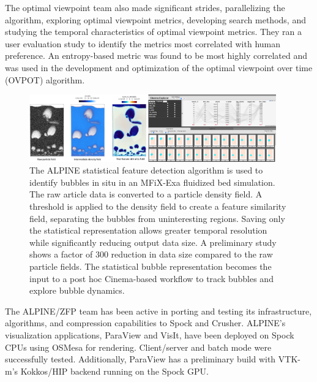 
The optimal viewpoint team also made significant strides, parallelizing the algorithm, exploring optimal viewpoint metrics, developing search methods, and studying the temporal characteristics of optimal viewpoint metrics.  They ran a user evaluation study to identify the metrics most correlated with human preference.  An entropy-based metric was found to be most highly correlated and was used in the development and optimization of the optimal viewpoint over time (OVPOT) algorithm.  

\begin{figure}[htb]
	\begin{center}
		\includegraphics[width=0.95\textwidth]{projects/2.3.4-DataViz/2.3.4.16-ALPINE-ZFP/alpine-cinema-mfixexa-workflow.png}
		\caption{The ALPINE statistical feature detection algorithm is used to identify bubbles in situ in an MFiX-Exa fluidized bed simulation.  The raw article data is converted to a particle density field.  A threshold is applied to the density field to create a feature similarity field, separating the  bubbles from uninteresting regions.  Saving only the statistical representation allows greater temporal resolution while significantly reducing output data size.  A preliminary study shows a factor of 300 reduction in data size compared to the raw particle fields. The statistical bubble representation becomes the input to a post hoc Cinema-based workflow to track bubbles and explore bubble dynamics. }
		\label{fig:alpine-statistical-feature}
	\end{center}
\end{figure}

The ALPINE/ZFP team has been active in porting and testing its infrastructure, algorithms, and compression capabilities to Spock and Crusher.  ALPINE’s visualization applications, ParaView and VisIt, have been deployed on Spock CPUs using OSMesa for rendering.  Client/server and batch mode were successfully tested.  Additionally, ParaView has a preliminary build with VTK-m’s Kokkos/HIP backend running on the Spock GPU.  

